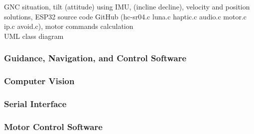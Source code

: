 \noindent GNC situation, tilt (attitude) using IMU, (incline decline), velocity and position solutions, ESP32 source code GitHub (hc-sr04.c luna.c haptic.c audio.c motor.c ip.c avoid.c), motor commands calculation\\

\noindent UML class diagram\\

\subsubsection{Guidance, Navigation, and Control Software}

\subsubsection{Computer Vision}

\subsubsection{Serial Interface}

\subsubsection{Motor Control Software}